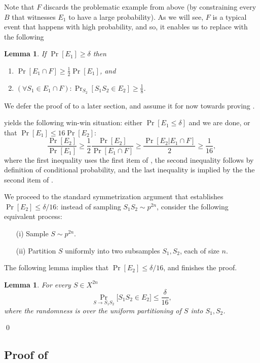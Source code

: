 \documentclass{article}
\newtheorem{lemma}[theorem]{Lemma}
\begin{document}
Note that $F$ discards the problematic example from above 
(by constraining every $B$ that witnesses $E_1$ to have a large probability). 
As we will see, $F$ is a typical event that happens with high probability,
and so, it enables us to replace  with the following
\begin{lemma}\label{lem:reduction}
If $\Pr[E_1]\geq \delta$ then 
\begin{enumerate}
\item $\Pr[E_1\cap F] \geq \frac{1}{2}\Pr[E_1]$, and
\item $(\forall S_1\in E_1\cap F): \Pr_{S_2}[S_1S_2\in E_2] \geq \frac{1}{8}$. 
\end{enumerate}
\end{lemma}
We defer the proof of  to a later section, 
and assume it for now towards proving .

 yields the following win-win situation:
either $\Pr[E_1 \leq \delta]$ and we are done, 
or that $\Pr[E_1]\leq 16\Pr[E_2]$:
\[\frac{\Pr[E_2]}{\Pr[E_1]} \geq  \frac{1}{2}\frac{\Pr[E_2]}{\Pr[E_1\cap F]} \geq \frac{\Pr[E_2 \vert E_1\cap F]}{2} \geq \frac{1}{16},\]
where the first inequality uses the first item of , 
the second inequality follows by definition of conditional probability,
and the last inequality is implied by the the second item of .


We proceed to the standard symmetrization argument
that establishes $\Pr[E_2]\leq\delta/16$:
instead of sampling $S_1S_2\sim p^{2n}$,
consider the following equivalent process:
\begin{itemize}
\item[(i)] Sample $S\sim p^{2n}$.
\item[(ii)] Partition $S$ uniformly into two subsamples $S_1,S_2$, each of size $n$.
\end{itemize}
The following lemma implies that $\Pr[E_2]\leq \delta/16$, and finishes the proof.
\begin{lemma}\label{lem:e2}
For every $S\in X^{2n}$
\[\Pr_{S\to S_1S_2}\bigl[S_1S_2\in E_2\bigr]\leq \frac{\delta}{16},\]
where the randomness is over the uniform partitioning
of $S$ into $S_1,S_2$.
\end{lemma}
\qed

\subsection{Proof of }
\end{document}
